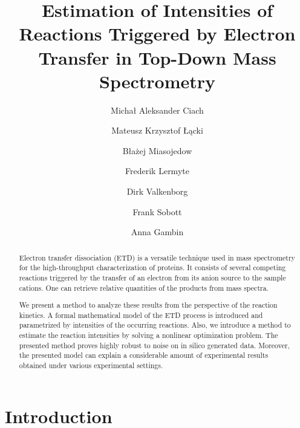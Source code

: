 \documentclass{llncs}
\begin{document}
\pagestyle{plain}
\title{Estimation of Intensities of Reactions Triggered by Electron Transfer in Top-Down Mass Spectrometry}
\author{Michał Aleksander Ciach \and Mateusz Krzysztof Łącki \and Błażej Miasojedow \and Frederik Lermyte \and Dirk Valkenborg \and Frank Sobott \and Anna Gambin }






\maketitle
\begin{abstract}
Electron transfer dissociation (ETD) is a versatile technique used in mass spectrometry for the high-throughput characterization of proteins. It consists of several competing reactions triggered by the transfer of an electron from its anion source to the sample cations. One can retrieve relative quantities of the products from mass spectra.

We present a method to analyze these results from the perspective of the reaction kinetics. A formal mathematical model of the ETD process is introduced and parametrized by intensities of the occurring reactions. Also, we introduce a method to estimate the reaction intensities by solving a nonlinear optimization problem. The presented method proves highly robust to noise on in silico generated data. Moreover, the presented model can explain a considerable amount of experimental results obtained under various experimental settings.
\end{abstract}

\section{Introduction}
\end{document}
